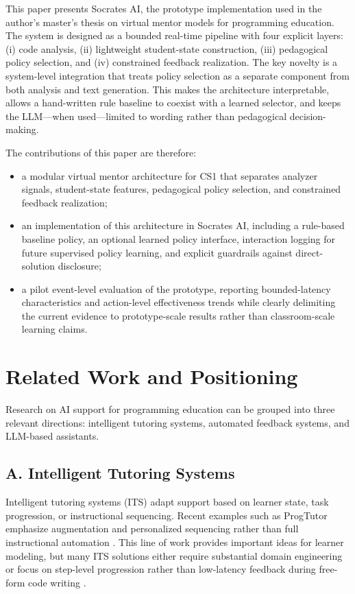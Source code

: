 ﻿\documentclass[conference]{IEEEtran}
\newcommand{\system}{Socrates AI}
\begin{document}
This paper presents \system, the prototype implementation used in the author's master's thesis on virtual mentor models for programming education. The system is designed as a bounded real-time pipeline with four explicit layers: (i) code analysis, (ii) lightweight student-state construction, (iii) pedagogical policy selection, and (iv) constrained feedback realization. The key novelty is a system-level integration that treats policy selection as a separate component from both analysis and text generation. This makes the architecture interpretable, allows a hand-written rule baseline to coexist with a learned selector, and keeps the LLM---when used---limited to wording rather than pedagogical decision-making.

The contributions of this paper are therefore:
\begin{itemize}
\item a modular virtual mentor architecture for CS1 that separates analyzer signals, student-state features, pedagogical policy selection, and constrained feedback realization;
\item an implementation of this architecture in \system, including a rule-based baseline policy, an optional learned policy interface, interaction logging for future supervised policy learning, and explicit guardrails against direct-solution disclosure;
\item a pilot event-level evaluation of the prototype, reporting bounded-latency characteristics and action-level effectiveness trends while clearly delimiting the current evidence to prototype-scale results rather than classroom-scale learning claims.
\end{itemize}

\section{Related Work and Positioning}

Research on AI support for programming education can be grouped into three relevant directions: intelligent tutoring systems, automated feedback systems, and LLM-based assistants.

\subsection*{A. Intelligent Tutoring Systems}

Intelligent tutoring systems (ITS) adapt support based on learner state, task progression, or instructional sequencing. Recent examples such as ProgTutor emphasize augmentation and personalized sequencing rather than full instructional automation \cite{ProgTutor}. This line of work provides important ideas for learner modeling, but many ITS solutions either require substantial domain engineering or focus on step-level progression rather than low-latency feedback during free-form code writing \cite{Francisco2022,Chrysafiadi2022}.
\end{document}
